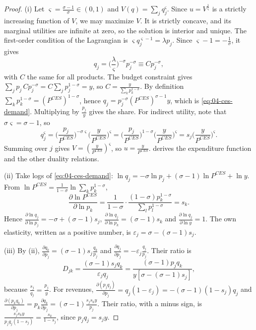 \begin{proof}
(i) Let $\varsigma = \frac{\sigma - 1}{\sigma} \in (0,1)$ and $V(q) = \sum_j q_j^\varsigma$. Since $u = V^{\frac{1}{\varsigma}}$ is a strictly
increasing function of $V$, we may maximize $V$. It is strictly concave, and its marginal utilities are infinite at
zero, so the solution is interior and unique. The first-order condition of the Lagrangian is
$\varsigma q_j^{\varsigma-1} = \lambda p_j$. Since $\varsigma - 1 = -\frac{1}{\sigma}$, it gives
\begin{equation*}
q_j = \Big(\frac{\lambda}{\varsigma}\Big)^{-\sigma}p_j^{-\sigma} \equiv Cp_j^{-\sigma},
\end{equation*}
with $C$ the same for all products. The budget constraint gives $\sum_j p_j\,Cp_j^{-\sigma} = C\sum_j p_j^{1-\sigma} = y$,
so $C = \frac{y}{\sum_k p_k^{1-\sigma}}$. By definition $\sum_k p_k^{1-\sigma} = (P^{CES})^{1-\sigma}$, hence
$q_j = p_j^{-\sigma}(P^{CES})^{\sigma-1}y$, which is \eqref{eq:04-ces-demand}. Multiplying by $\frac{p_j}{y}$ gives
the share. For indirect utility, note that $\sigma\varsigma = \sigma - 1$, so
\begin{equation*}
q_j^\varsigma = \Big(\frac{p_j}{P^{CES}}\Big)^{-\sigma\varsigma}\Big(\frac{y}{P^{CES}}\Big)^\varsigma
= \Big(\frac{p_j}{P^{CES}}\Big)^{1-\sigma}\Big(\frac{y}{P^{CES}}\Big)^\varsigma = s_j\Big(\frac{y}{P^{CES}}\Big)^\varsigma .
\end{equation*}
Summing over $j$ gives $V = (\frac{y}{P^{CES}})^\varsigma$, so $u = \frac{y}{P^{CES}}$.  derives the
expenditure function and the other duality relations.

(ii) Take logs of \eqref{eq:04-ces-demand}: $\ln q_j = -\sigma\ln p_j + (\sigma - 1)\ln P^{CES} + \ln y$. From
$\ln P^{CES} = \frac{1}{1-\sigma}\ln\sum_k p_k^{1-\sigma}$,
\begin{equation*}
\frac{\partial\ln P^{CES}}{\partial\ln p_k} = \frac{1}{1-\sigma}\cdot\frac{(1-\sigma)p_k^{1-\sigma}}{\sum_l p_l^{1-\sigma}} = s_k .
\end{equation*}
Hence $\frac{\partial\ln q_j}{\partial\ln p_j} = -\sigma + (\sigma - 1)s_j$, $\frac{\partial\ln q_j}{\partial\ln p_k} = (\sigma - 1)s_k$
and $\frac{\partial\ln q_j}{\partial\ln y} = 1$. The own elasticity, written as a positive number, is
$\varepsilon_j = \sigma - (\sigma - 1)s_j$.

(iii) By (ii), $\frac{\partial q_k}{\partial p_j} = (\sigma - 1)s_j\frac{q_k}{p_j}$ and
$\frac{\partial q_j}{\partial p_j} = -\varepsilon_j\frac{q_j}{p_j}$. Their ratio is
\begin{equation*}
D_{jk} = \frac{(\sigma - 1)s_jq_k}{\varepsilon_jq_j} = \frac{(\sigma - 1)p_jq_k}{y[\sigma - (\sigma - 1)s_j]},
\end{equation*}
because $\frac{s_j}{q_j} = \frac{p_j}{y}$. For revenues, $\frac{\partial(p_jq_j)}{\partial p_j} = q_j(1 - \varepsilon_j) = -(\sigma - 1)(1 - s_j)q_j$
and $\frac{\partial(p_kq_k)}{\partial p_j} = p_k\frac{\partial q_k}{\partial p_j} = (\sigma - 1)\frac{s_js_ky}{p_j}$. Their ratio, with a minus
sign, is $\frac{s_js_ky}{p_jq_j(1 - s_j)} = \frac{s_k}{1 - s_j}$, since $p_jq_j = s_jy$.


\end{proof}
